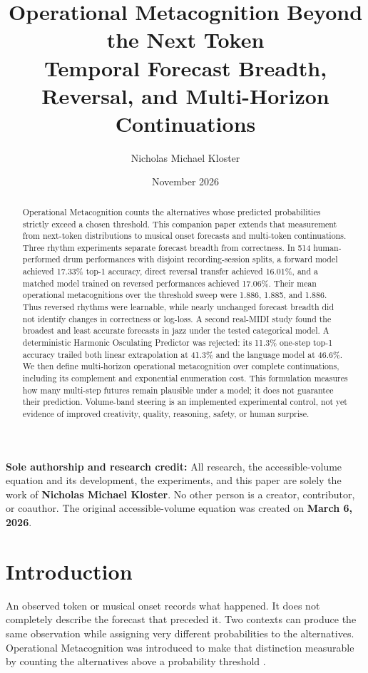 \documentclass[11pt,a4paper]{article}
\title{\textbf{Operational Metacognition Beyond the Next Token}\\[5pt]
\large Temporal Forecast Breadth, Reversal, and Multi-Horizon Continuations}
\author{Nicholas Michael Kloster}
\date{November 2026}
\begin{document}
\maketitle
\thispagestyle{fancy}

\noindent\textbf{Sole authorship and research credit:} All research, the accessible-volume equation and its development, the experiments, and this paper are solely the work of \textbf{Nicholas Michael Kloster}. No other person is a creator, contributor, or coauthor. The original accessible-volume equation was created on \textbf{March 6, 2026}.

\begin{abstract}
Operational Metacognition counts the alternatives whose predicted probabilities strictly exceed a chosen threshold. This companion paper extends that measurement from next-token distributions to musical onset forecasts and multi-token continuations. Three rhythm experiments separate forecast breadth from correctness. In 514 human-performed drum performances with disjoint recording-session splits, a forward model achieved 17.33\% top-1 accuracy, direct reversal transfer achieved 16.01\%, and a matched model trained on reversed performances achieved 17.06\%. Their mean operational metacognitions over the threshold sweep were 1.886, 1.885, and 1.886. Thus reversed rhythms were learnable, while nearly unchanged forecast breadth did not identify changes in correctness or log-loss. A second real-MIDI study found the broadest and least accurate forecasts in jazz under the tested categorical model. A deterministic Harmonic Osculating Predictor was rejected: its 11.3\% one-step top-1 accuracy trailed both linear extrapolation at 41.3\% and the language model at 46.6\%. We then define multi-horizon operational metacognition over complete continuations, including its complement and exponential enumeration cost. This formulation measures how many multi-step futures remain plausible under a model; it does not guarantee their prediction. Volume-band steering is an implemented experimental control, not yet evidence of improved creativity, quality, reasoning, safety, or human surprise.
\end{abstract}

\section{Introduction}
An observed token or musical onset records what happened. It does not completely describe the forecast that preceded it. Two contexts can produce the same observation while assigning very different probabilities to the alternatives. Operational Metacognition was introduced to make that distinction measurable by counting the alternatives above a probability threshold \cite{kloster2026significance}.
\end{document}
